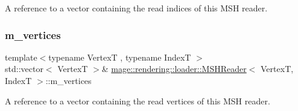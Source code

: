 A reference to a vector containing the read indices of this M\+SH reader. \mbox{\label{classmage_1_1rendering_1_1loader_1_1_m_s_h_reader_a57e5f4e14aecbce999df14d0dcaba4e5}} 
\subsubsection{\texorpdfstring{m\+\_\+vertices}{m\_vertices}}
{\footnotesize\ttfamily template$<$typename VertexT , typename IndexT $>$ \\
std\+::vector$<$ VertexT $>$\& \mbox{\hyperlink{classmage_1_1rendering_1_1loader_1_1_m_s_h_reader}{mage\+::rendering\+::loader\+::\+M\+S\+H\+Reader}}$<$ VertexT, IndexT $>$\+::m\+\_\+vertices\hspace{0.3cm}{\ttfamily [private]}}

A reference to a vector containing the read vertices of this M\+SH reader. 